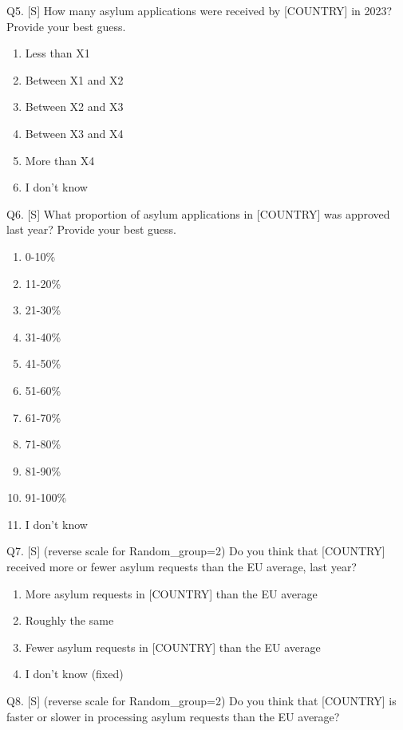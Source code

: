 \documentclass[
  12pt,
  a4paper,
]{article}
\providecommand{\tightlist}{%
  \setlength{\itemsep}{0pt}\setlength{\parskip}{0pt}}
\begin{document}
Q5. {[}S{]} How many asylum applications were received by {[}COUNTRY{]} in 2023?\\
Provide your best guess.

\begin{enumerate}
\def\labelenumi{\arabic{enumi}.}
\item
  Less than X1
\item
  Between X1 and X2
\item
  Between X2 and X3
\item
  Between X3 and X4
\item
  More than X4
\item
  I don't know
\end{enumerate}

Q6. {[}S{]} What proportion of asylum applications in {[}COUNTRY{]} was approved last year? Provide your best guess.

\begin{enumerate}
\def\labelenumi{\arabic{enumi}.}
\tightlist
\item
  0-10\%
\item
  11-20\%
\item
  21-30\%
\item
  31-40\%
\item
  41-50\%
\item
  51-60\%
\item
  61-70\%
\item
  71-80\%
\item
  81-90\%
\item
  91-100\%
\item
  I don't know
\end{enumerate}

Q7. {[}S{]} (reverse scale for Random\_group=2) Do you think that {[}COUNTRY{]} received more or fewer asylum requests than the EU average, last year?

\begin{enumerate}
\def\labelenumi{\arabic{enumi}.}
\tightlist
\item
  More asylum requests in {[}COUNTRY{]} than the EU average
\item
  Roughly the same
\item
  Fewer asylum requests in {[}COUNTRY{]} than the EU average
\item
  I don't know (fixed)
\end{enumerate}

Q8. {[}S{]} (reverse scale for Random\_group=2) Do you think that {[}COUNTRY{]} is faster or slower in processing asylum requests than the EU average?
\end{document}
